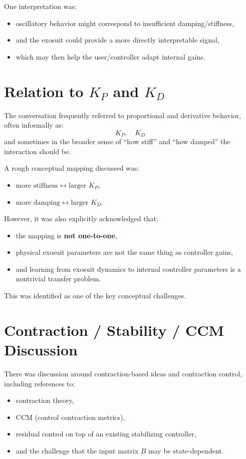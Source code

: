\documentclass[11pt]{article}
\begin{document}
One interpretation was:
\begin{itemize}[leftmargin=1.5em]
    \item oscillatory behavior might correspond to insufficient damping/stiffness,
    \item and the exosuit could provide a more directly interpretable signal,
    \item which may then help the user/controller adapt internal gains.
\end{itemize}

\section{Relation to \(K_P\) and \(K_D\)}
The conversation frequently referred to proportional and derivative behavior, often informally as:
\[
K_P, \quad K_D
\]
and sometimes in the broader sense of ``how stiff'' and ``how damped'' the interaction should be.

A rough conceptual mapping discussed was:
\begin{itemize}[leftmargin=1.5em]
    \item \(\text{more stiffness} \leftrightarrow \text{larger } K_P\),
    \item \(\text{more damping} \leftrightarrow \text{larger } K_D\).
\end{itemize}

However, it was also explicitly acknowledged that:
\begin{itemize}[leftmargin=1.5em]
    \item the mapping is \textbf{not one-to-one},
    \item physical exosuit parameters are not the same thing as controller gains,
    \item and learning from exosuit dynamics to internal controller parameters is a nontrivial transfer problem.
\end{itemize}

This was identified as one of the key conceptual challenges.

\section{Contraction / Stability / CCM Discussion}
There was discussion around contraction-based ideas and contraction control, including references to:
\begin{itemize}[leftmargin=1.5em]
    \item contraction theory,
    \item CCM (control contraction metrics),
    \item residual control on top of an existing stabilizing controller,
    \item and the challenge that the input matrix \(B\) may be state-dependent.
\end{itemize}
\end{document}
